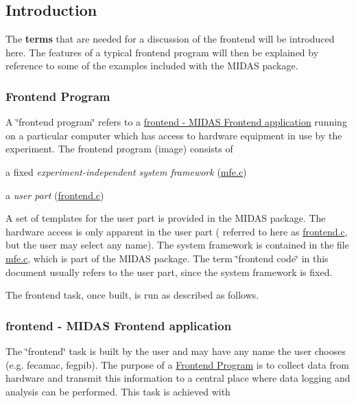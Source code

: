\par
 

\par
\hypertarget{FrontendOperation_FE_Intro}{}\subsection{Introduction}\label{FrontendOperation_FE_Intro}
The {\bfseries terms} that are needed for a discussion of the frontend will be introduced here. The features of a typical frontend program will then be explained by reference to some of the examples included with the MIDAS package. \par
\hypertarget{FrontendOperation_FE_program}{}\subsubsection{Frontend Program}\label{FrontendOperation_FE_program}
A \char`\"{}frontend program\char`\"{} refers to a \hyperlink{FrontendOperation_FE_frontend_utility}{frontend -\/ MIDAS Frontend application} running on a particular computer which has access to hardware equipment in use by the experiment. The frontend program (image) consists of
\begin{DoxyItemize}
\item a fixed {\itshape experiment-\/independent system framework\/} (\hyperlink{mfe_8c}{mfe.c})
\item a {\itshape user part\/} (\hyperlink{frontend_8c}{frontend.c})
\end{DoxyItemize}

A set of templates for the user part is provided in the MIDAS package. The hardware access is only apparent in the user part ( referred to here as \hyperlink{frontend_8c}{frontend.c}, but the user may select any name). The system framework is contained in the file \hyperlink{mfe_8c}{mfe.c}, which is part of the MIDAS package. The term \char`\"{}frontend code\char`\"{} in this document usually refers to the user part, since the system framework is fixed. \par


The frontend task, once built, is run as described as follows.

\label{FrontendOperation_idx_frontend_utility}
\hypertarget{FrontendOperation_idx_frontend_utility}{}
 \hypertarget{FrontendOperation_FE_frontend_utility}{}\subsubsection{frontend  -\/ MIDAS Frontend application}\label{FrontendOperation_FE_frontend_utility}
The \char`\"{}frontend\char`\"{} task is built by the user and may have any name the user chooses (e.g. fecamac, fegpib). The purpose of a \hyperlink{FrontendOperation_FE_program}{Frontend Program} is to collect data from hardware and transmit this information to a central place where data logging and analysis can be performed. This task is achieved with



